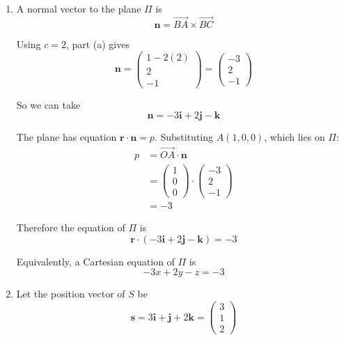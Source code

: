 \documentclass[leqno]{article}
\begin{document}
\begin{enumerate}[
  label=\textbf{\arabic*.},
  leftmargin=*,
  topsep=0pt,
  partopsep=0pt,
  parsep=0pt
]
\begin{djsSolution}
\begin{enumerate}[label=\textbf{(\alph*)}]
From part (a):
\[
\overrightarrow{BA}\times \overrightarrow{BC}=(1-2c)\mathbf i+c\mathbf j-\mathbf k
\]

Comparing coefficients of \(\mathbf j\):
\[
c=2
\]

Then comparing coefficients of \(\mathbf i\):
\[
d=1-2c=1-2(2)=1-4=-3
\]

Hence
\[
c=2 \quad \text{and} \quad d=-3
\]

  \item A normal vector to the plane \(\Pi\) is
\[
\mathbf n=\overrightarrow{BA}\times \overrightarrow{BC}
\]

Using \(c=2\), part (a) gives
\[
\mathbf n=\begin{pmatrix}1-2(2)\\2\\-1\end{pmatrix}=\begin{pmatrix}-3\\2\\-1\end{pmatrix}
\]

So we can take
\[
\mathbf n=-3\mathbf i+2\mathbf j-\mathbf k
\]

The plane has equation \(\mathbf r\cdot \mathbf n=p\). Substituting \(A(1,0,0)\), which lies on \(\Pi\):
\begin{align*}
p&=\overrightarrow{OA}\cdot \mathbf n \\
&=\begin{pmatrix}1\\0\\0\end{pmatrix}\cdot\begin{pmatrix}-3\\2\\-1\end{pmatrix} \\
&=-3
\end{align*}

Therefore the equation of \(\Pi\) is
\[
\mathbf r\cdot(-3\mathbf i+2\mathbf j-\mathbf k)=-3
\]

Equivalently, a Cartesian equation of \(\Pi\) is
\[
-3x+2y-z=-3
\]

  \item Let the position vector of \(S\) be
\[
\mathbf s=3\mathbf i+\mathbf j+2\mathbf k=\begin{pmatrix}3\\1\\2\end{pmatrix}
\]


\end{enumerate}
\end{djsSolution}
\end{enumerate}
\end{document}
